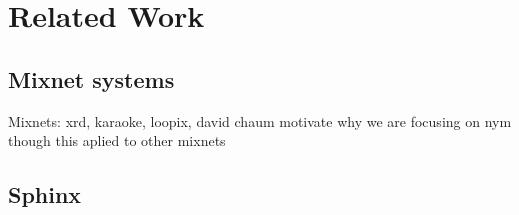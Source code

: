 \section{Related Work}
\subsection{Mixnet systems}
Mixnets: xrd, karaoke, loopix, david chaum
motivate why we are focusing on nym though this aplied to other mixnets
\subsection{Sphinx}
